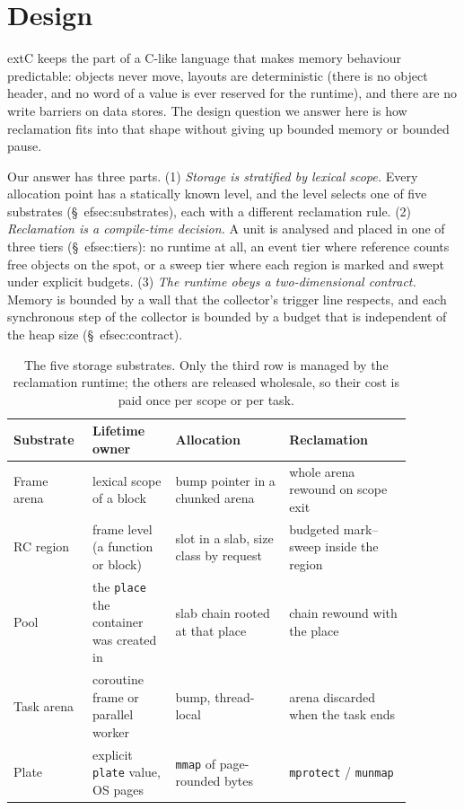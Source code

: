\section{Design}
\label{sec:design}

extC keeps the part of a C-like language that makes memory behaviour predictable:
objects never move, layouts are deterministic (there is no object header, and no word of a value
is ever reserved for the runtime), and there are no write barriers on data stores.
The design question we answer here is how reclamation fits into that shape without giving up
bounded memory or bounded pause.

Our answer has three parts.
(1) \emph{Storage is stratified by lexical scope.} Every allocation point has a statically known
level, and the level selects one of five substrates (\S\
ef{sec:substrates}), each with a different
reclamation rule.
(2) \emph{Reclamation is a compile-time decision.} A unit is analysed and placed in one of three
tiers (\S\
ef{sec:tiers}): no runtime at all, an event tier where reference counts free objects on
the spot, or a sweep tier where each region is marked and swept under explicit budgets.
(3) \emph{The runtime obeys a two-dimensional contract.} Memory is bounded by a wall that the
collector's trigger line respects, and each synchronous step of the collector is bounded by a
budget that is independent of the heap size (\S\
ef{sec:contract}).

\begin{table}[t]
\centering
\small
\begin{tabular}{@{}p{0.15\linewidth}p{0.19\linewidth}p{0.26\linewidth}p{0.28\linewidth}@{}}
\toprule
Substrate & Lifetime owner & Allocation & Reclamation \\
\midrule
Frame arena & lexical scope of a block & bump pointer in a chunked arena & whole arena rewound on scope exit \\
RC region & frame level (a function or block) & slot in a slab, size class by request & budgeted mark--sweep inside the region \\
Pool & the \texttt{place} the container was created in & slab chain rooted at that place & chain rewound with the place \\
Task arena & coroutine frame or parallel worker & bump, thread-local & arena discarded when the task ends \\
Plate & explicit \texttt{plate} value, OS pages & \texttt{mmap} of page-rounded bytes & \texttt{mprotect} / \texttt{munmap} \\
\bottomrule
\end{tabular}
\caption{The five storage substrates. Only the third row is managed by the reclamation runtime;
the others are released wholesale, so their cost is paid once per scope or per task.}
\label{tab:substrates}
\end{table}

